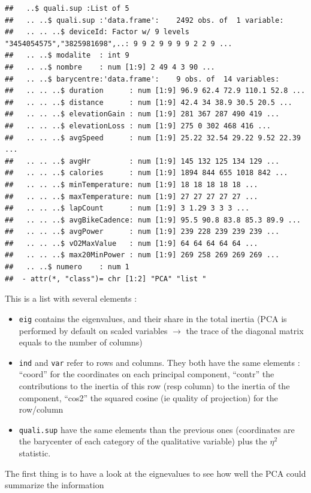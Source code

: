 \documentclass[
]{book}
\providecommand{\tightlist}{%
  \setlength{\itemsep}{0pt}\setlength{\parskip}{0pt}}
\begin{document}
\begin{verbatim}
##   ..$ quali.sup :List of 5
##   .. ..$ quali.sup :'data.frame':	2492 obs. of  1 variable:
##   .. .. ..$ deviceId: Factor w/ 9 levels "3454054575","3825981698",..: 9 9 2 9 9 9 9 2 2 9 ...
##   .. ..$ modalite  : int 9
##   .. ..$ nombre    : num [1:9] 2 49 4 3 90 ...
##   .. ..$ barycentre:'data.frame':	9 obs. of  14 variables:
##   .. .. ..$ duration      : num [1:9] 96.9 62.4 72.9 110.1 52.8 ...
##   .. .. ..$ distance      : num [1:9] 42.4 34 38.9 30.5 20.5 ...
##   .. .. ..$ elevationGain : num [1:9] 281 367 287 490 419 ...
##   .. .. ..$ elevationLoss : num [1:9] 275 0 302 468 416 ...
##   .. .. ..$ avgSpeed      : num [1:9] 25.22 32.54 29.22 9.52 22.39 ...
##   .. .. ..$ avgHr         : num [1:9] 145 132 125 134 129 ...
##   .. .. ..$ calories      : num [1:9] 1894 844 655 1018 842 ...
##   .. .. ..$ minTemperature: num [1:9] 18 18 18 18 18 ...
##   .. .. ..$ maxTemperature: num [1:9] 27 27 27 27 27 ...
##   .. .. ..$ lapCount      : num [1:9] 3 1.29 3 3 3 ...
##   .. .. ..$ avgBikeCadence: num [1:9] 95.5 90.8 83.8 85.3 89.9 ...
##   .. .. ..$ avgPower      : num [1:9] 239 228 239 239 239 ...
##   .. .. ..$ vO2MaxValue   : num [1:9] 64 64 64 64 64 ...
##   .. .. ..$ max20MinPower : num [1:9] 269 258 269 269 269 ...
##   .. ..$ numero    : num 1
##  - attr(*, "class")= chr [1:2] "PCA" "list "
\end{verbatim}

This is a list with several elements :

\begin{itemize}
\tightlist
\item
  \texttt{eig} contains the eigenvalues, and their share in the total inertia (PCA is performed by default on scaled variables \(\rightarrow\) the trace of the diagonal matrix equals to the number of columns)
\item
  \texttt{ind} and \texttt{var} refer to rows and columns. They both have the same elements : ``coord'' for the coordinates on each principal component, ``contr'' the contributions to the inertia of this row (resp column) to the inertia of the component, ``cos2'' the squared cosine (ie quality of projection) for the row/column
\item
  \texttt{quali.sup} have the same elements than the previous ones (coordinates are the barycenter of each category of the qualitative variable) plus the \(\eta^2\) statistic.
\end{itemize}

The first thing is to have a look at the eignevalues to see how well the PCA could summarize the information
\end{document}
